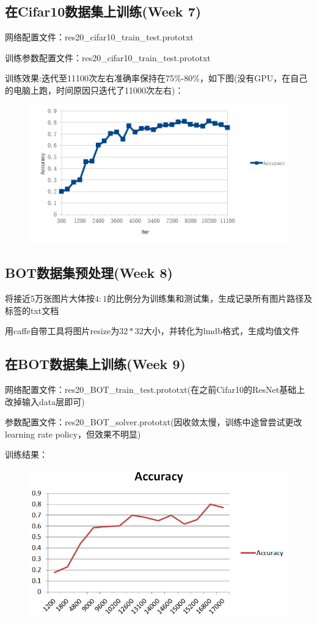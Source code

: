 \documentclass[UTF8]{ctexart}
\begin{document}
	\subsection{在Cifar10数据集上训练(Week 7)}
		网络配置文件：res20\_cifar10\_train\_test.prototxt
		
		训练参数配置文件：res20\_cifar10\_train\_test.prototxt
		
		训练效果:迭代至11100次左右准确率保持在75\%-80\%，如下图(没有GPU，在自己的电脑上跑，时间原因只迭代了11000次左右)：
		\begin{figure}
			\centering
			\includegraphics[scale=0.7]{4.png}
		\end{figure}
	
	\subsection{BOT数据集预处理(Week 8)}
		将接近5万张图片大体按$4:1$的比例分为训练集和测试集，生成记录所有图片路径及标签的txt文档
		
		用caffe自带工具将图片resize为$32*32$大小，并转化为lmdb格式，生成均值文件
	
	\subsection{在BOT数据集上训练(Week 9)}
	 	网络配置文件：res20\_BOT\_train\_test.prototxt(在之前Cifar10的ResNet基础上改掉输入data层即可)
	 	
	 	参数配置文件：res20\_BOT\_solver.prototxt(因收敛太慢，训练中途曾尝试更改learning rate policy，但效果不明显)
	 	
	 	训练结果：
	 	\begin{figure}
	 		\centering
	 		\includegraphics[scale=0.7]{5.png}	
	 	\end{figure}
\end{document}
